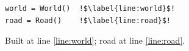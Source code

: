 \documentclass{article}
\begin{document}
\begin{verbatim}
world = World()  !$\label{line:world}$!
road = Road()    !$\label{line:road}$!
\end{verbatim}
Built at line \ref{line:world}; road at line \ref{line:road}.
\end{document}
